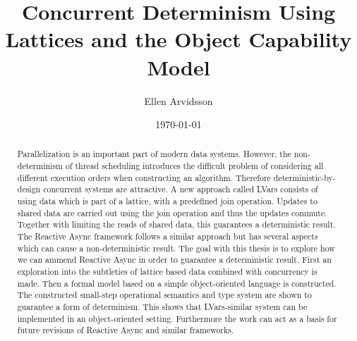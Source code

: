 \documentclass{kththesis}
\title{Concurrent Determinism Using Lattices and the Object Capability Model}
\author{Ellen Arvidsson}
\date{\today}
\begin{document}
\frontmatter

\titlepage

\begin{abstract}
  Parallelization is an important part of modern data systems. However, the
  non-determinism of thread scheduling introduces the difficult problem of
  considering all different execution orders when constructing an algorithm.
  Therefore deterministic-by-design concurrent systems are attractive.  A new
  approach called LVars consists of using data which is part of a lattice, with
  a predefined join operation. Updates to shared data are carried out using the
  join operation and thus the updates commute. Together with limiting the reads
  of shared data, this guarantees a deterministic result. The Reactive Async
  framework follows a similar approach but has several aspects which can cause a
  non-deterministic result. The goal with this thesis is to explore how we can
  ammend Reactive Async in order to guarantee a deterministic result. First an
  exploration into the subtleties of lattice based data combined with
  concurrency is made.  Then a formal model based on a simple object-oriented
  language is constructed.  The constructed small-step operational semantics and
  type system are shown to guarantee a form of determinism. This shows that
  LVars-similar system can be implemented in an object-oriented setting.
  Furthermore the work can act as a basis for future revisions of Reactive Async
  and similar frameworks.
\end{abstract}
\end{document}
